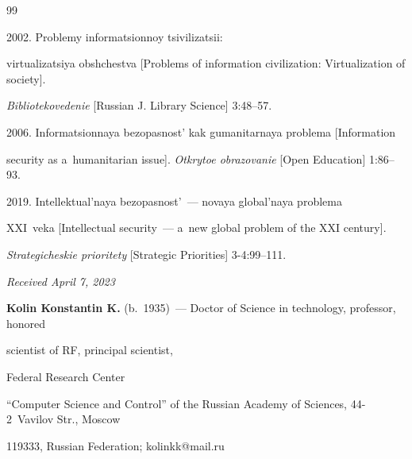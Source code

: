 {{\begin{thebibliography}{99}


 2002. Prob\-le\-my in\-for\-ma\-tsi\-on\-noy tsi\-vi\-li\-za\-tsii:  


vir\-tua\-li\-za\-tsiya ob\-shchest\-va [Problems of information civilization: Virtualization of society]. 


\textit{Bib\-lio\-te\-ko\-ve\-de\-nie} [Russian J. Library Science] 3:48--57.







 2006. In\-for\-ma\-tsi\-on\-naya bezopas\-nost' kak gu\-ma\-ni\-tar\-naya prob\-le\-ma [Information 


security as a~humanitarian issue]. \textit{Ot\-kry\-toe ob\-ra\-zo\-va\-nie} [Open Education] 1:86--93.







 2019. Intellektual'naya bezopas\-nost'~--- no\-vaya glo\-bal'\-naya prob\-le\-ma 


XXI~veka [Intellectual security~--- a~new global problem of the XXI century]. 


\textit{Stra\-te\-gi\-che\-skie pri\-o\-ri\-te\-ty} [Strategic Priorities] 3-4:99--111.


 \end{thebibliography}


} }





\vspace*{-6pt}





\hfill{\small\textit{Received April 7, 2023}} 





\vspace*{-12pt} 








\Contrl





\noindent


\textbf{Kolin Konstantin K.} (b.\ 1935)~--- Doctor of Science in technology, professor, honored 


scientist of RF, principal scientist, %


Federal Research Center 


``Computer Science and Control'' of the Russian Academy of Sciences, 44-2~Vavilov Str., Moscow 


119333, Russian Federation; \mbox{kolinkk@mail.ru}








\label{end\stat}





\renewcommand{\bibname}{\protect\rm Литература}  


